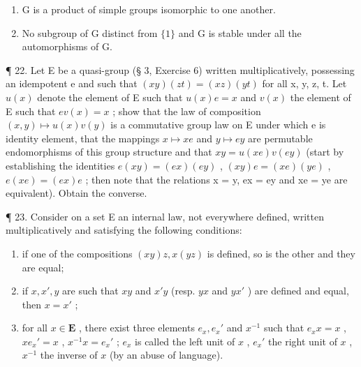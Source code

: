 \begin{enumerate}
\def\labelenumi{(\alph{enumi})}
\item
  G is a product of simple groups isomorphic to one another.
\item
  No subgroup of G distinct from \(\{1\}\) and G is stable under all the automorphisms of G.
\end{enumerate}

¶ 22. Let E be a quasi-group (§ 3, Exercise 6) written multiplicatively, possessing an idempotent e and such that \((xy)(zt) = (xz)(yt)\) for all x, y, z, t. Let \(u(x)\) denote the element of E such that \(u(x)e = x\) and \(v(x)\) the element of E such that \(ev(x) = x\) ; show that the law of composition \((x, y) \mapsto u(x)v(y)\) is a commutative group law on E under which e is identity element, that the mappings \(x \mapsto xe\) and \(y \mapsto ey\) are permutable endomorphisms of this group structure and that \(xy = u(xe)v(ey)\) (start by establishing the identities \(e(xy) = (ex)(ey)\) , \((xy)e = (xe)(ye)\) , \(e(xe) = (ex)e\) ; then note that the relations x = y, ex = ey and xe = ye are equivalent). Obtain the converse.

¶ 23. Consider on a set E an internal law, not everywhere defined, written multiplicatively and satisfying the following conditions:

\begin{enumerate}
\def\labelenumi{(\arabic{enumi})}
\item
  if one of the compositions \((xy)z, x(yz)\) is defined, so is the other and they are equal;
\item
  if \(x, x', y\) are such that \(xy\) and \(x'y\) (resp. \(yx\) and \(yx'\) ) are defined and equal, then \(x = x'\) ;
\item
  for all \(x \in \mathbf{E}\) , there exist three elements \(e_x, e_x'\) and \(x^{-1}\) such that \(e_xx = x\) , \(xe_x' = x\) , \(x^{-1}x = e_x'\) ; \(e_x\) is called the left unit of \(x\) , \(e_x'\) the right unit of \(x\) , \(x^{-1}\) the inverse of \(x\) (by an abuse of language).
\end{enumerate}

